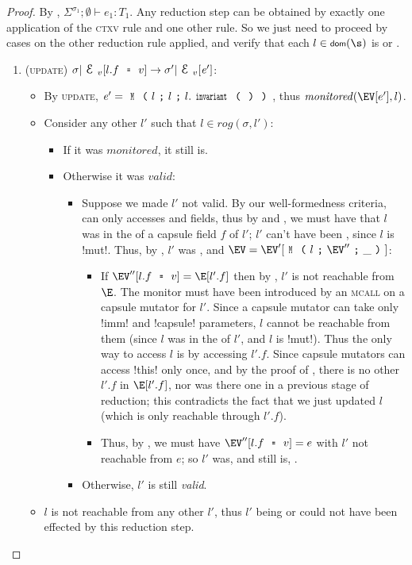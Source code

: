 \begin{proof}
By , $\Sigma^{\sigma_1};\emptyset\vdash e_1: T_1$. Any reduction step can be obtained by exactly one application of the \textsc{ctxv} rule and one other rule. So we just need to proceed by cases on the other reduction rule applied, and verify that each $l \in \dom(\s)$ is \valid or \mony.
\SSI\begin{enumerate}
\item (\textsc{update}) $\sigma|\ctx_v[l.f\equals v]\rightarrow \sigma'|\ctx_v[\e']$:
	\begin{itemize}
	  \item By \textsc{update}, $\e'=\M{l}{l}{l.\invariant}$, thus $\mathit{monitored}(\EV[e'],l)$.
	  \item Consider any other $l'$ such that $l\in \mathit{rog}(\sigma,l')$:
	  \begin{itemize}
	  	\item If it was $\mathit{monitored}$, it still is.
	    \item Otherwise it was $\mathit{valid}$:
			\begin{itemize}
				\item Suppose we made $l'$ not valid. By our well-formedness criteria, \Q@invariant@ can only accesses \Q@imm@ and \Q@capsule@ fields, thus by  and , we must have that $l$ was in the \rog of a capsule field $f$ of $l'$; $l'$ can't have been \CNE, since $l$ is \Q!mut!. Thus, by \CFS, $l'$ was \CNO, and $\EV = \EV'[\M{l}{\EV''}{\_}]$:
				\begin{itemize}
					\item If $\EV''[l.f \equals v] = \E[l'.f]$ then by \CNO, $l'$ is not reachable from $\E$. The monitor must have been introduced by an \textsc{mcall} on a capsule mutator for $l'$. Since a capsule mutator can take only \Q!imm! and \Q!capsule! parameters, $l$ cannot be reachable from them (since $l$ was in the \rog of $l'$, and $l$ is \Q!mut!). Thus the only way to access $l$ is by accessing $l'.f$.
					Since capsule mutators can access \Q!this! only once, and by the proof of \CFS, there is no other $l'.f$ in $\E[l'.f]$, nor was there one in a previous stage of reduction; this contradicts the fact that we just updated $l$ (which is only reachable through $l'.f$).
					\item Thus, by \CNO, we must have $\EV''[l.f \equals v] = e$ with $l'$ not reachable from $e$; so $l'$ was, and still is, \mony.
				\end{itemize}
				\item Otherwise, $l'$ is still \emph{valid}.
		  	\end{itemize}
	  \end{itemize}
	  \item $l$ is not reachable from any other $l'$, thus $l'$ being \valid or \mony could not have been effected by this reduction step.
	\end{itemize}


\end{enumerate}
\end{proof}
